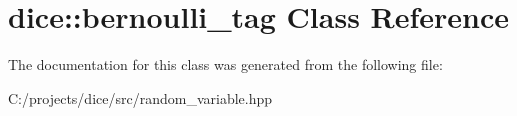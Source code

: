 \hypertarget{classdice_1_1bernoulli__tag}{}\section{dice\+:\+:bernoulli\+\_\+tag Class Reference}
\label{classdice_1_1bernoulli__tag}


The documentation for this class was generated from the following file\+:\begin{DoxyCompactItemize}
\item 
C\+:/projects/dice/src/random\+\_\+variable.\+hpp\end{DoxyCompactItemize}
